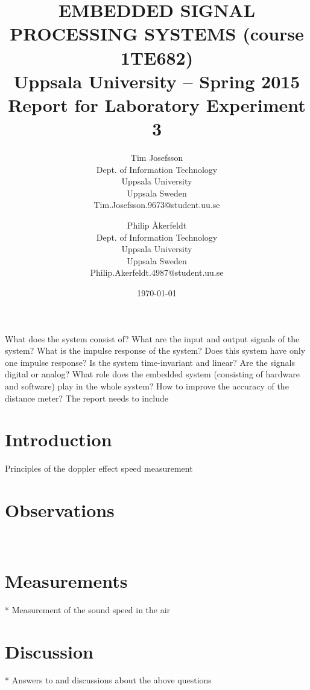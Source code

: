 \documentclass[a4paper,11pt]{article}
\title{\textbf{EMBEDDED SIGNAL PROCESSING SYSTEMS (course 1TE682) \\
    Uppsala University -- Spring 2015 \\
    Report for Laboratory Experiment 3  }}
\author{
Tim Josefsson\\
\textup{Dept. of Information Technology}\\
\textup{Uppsala University}\\
\textup{Uppsala Sweden}\\
\textup{Tim.Josefsson.9673@student.uu.se}
\and
Philip Åkerfeldt\\
\textup{Dept. of Information Technology}\\
\textup{Uppsala University}\\
\textup{Uppsala Sweden}\\
\textup{Philip.Akerfeldt.4987@student.uu.se}
}
\date{\today}
\begin{document}
\maketitle
\newpage
\tableofcontents
\pagebreak

What does the system consist of?
What are the input and output signals of the system?
What is the impulse response of the system?
Does this system have only one impulse response?
Is the system time-invariant and linear?
Are the signals digital or analog?
What role does the embedded system (consisting of hardware and software) play in the whole system?
How to improve the accuracy of the distance meter?
The report needs to include

\section{Introduction}
Principles of the doppler effect speed measurement \\

\section{Observations}
 \\

\section{Measurements}
* Measurement of the sound speed in the air \\

\section{Discussion}
* Answers to and discussions about the above questions\\
\end{document}
